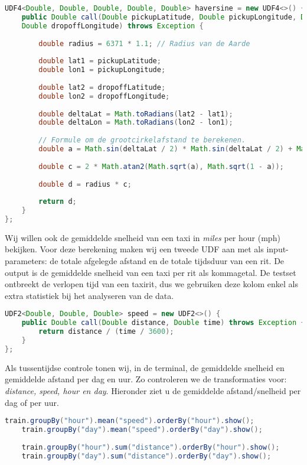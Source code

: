 \documentclass[a4paper,10pt,twoside]{report}
\begin{document}
\begin{lstlisting}[language=Java]
UDF4<Double, Double, Double, Double, Double> haversine = new UDF4<>() {
	public Double call(Double pickupLatitude, Double pickupLongitude, Double dropoffLatitude,
	Double dropoffLongitude) throws Exception {
		
		double radius = 6371 * 1.1; // Radius van de Aarde
		
		double lat1 = pickupLatitude;
		double lon1 = pickupLongitude;
		
		double lat2 = dropoffLatitude;
		double lon2 = dropoffLongitude;
		
		double deltaLat = Math.toRadians(lat2 - lat1);
		double deltaLon = Math.toRadians(lon2 - lon1);
		
		// Formule om de grootcirkelafstand te berekenen.
		double a = Math.sin(deltaLat / 2) * Math.sin(deltaLat / 2) + Math.cos(Math.toRadians(lat1)) * Math.cos(Math.toRadians(lat2)) * Math.sin(deltaLon / 2) * Math.sin(deltaLon / 2);
		
		double c = 2 * Math.atan2(Math.sqrt(a), Math.sqrt(1 - a));
		
		double d = radius * c;
		
		return d;
	}
};
\end{lstlisting}

Wij willen ook de gemiddelde snelheid van een taxi in \textit{miles} per hour (mph) bekijken. Voor deze berekening maken wij een tweede UDF aan met als input-parameters: de totale afgelegde afstand en de totale tijdsduur van een rit. De output is de gemiddelde snelheid van een taxi per rit als kommagetal. De testset ontbreekt de verlopen tijd van een taxirit, dus we gebruiken deze kolom enkel als extra statistiek bij het analyseren van de data.

\begin{lstlisting}[language=Java]
UDF2<Double, Double, Double> speed = new UDF2<>() {
	public Double call(Double distance, Double time) throws Exception {
		return distance / (time / 3600);
	}
};
\end{lstlisting}

Als tussentijdse controle tonen wij, in de terminal, de gemiddelde snelheid en gemiddelde afstand per dag en uur. Zo controleren we de transformaties voor: \textit{distance, speed, hour en day}. Hieronder ziet u de gemiddelde afstand/snelheid per dag of per uur. 

\begin{lstlisting}[language=Java]
	train.groupBy("hour").mean("speed").orderBy("hour").show();
	train.groupBy("day").mean("speed").orderBy("day").show();
	
	train.groupBy("hour").sum("distance").orderBy("hour").show();
	train.groupBy("day").sum("distance").orderBy("day").show();
\end{lstlisting}
\end{document}
